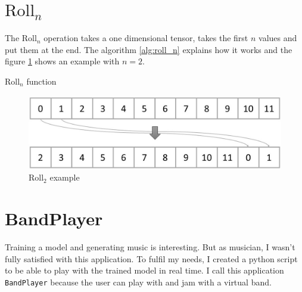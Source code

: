 \documentclass[12pt]{report}
\begin{document}
\section{$\text{Roll}_n$}
\label{appendix:roll_n}

The $\text{Roll}_n$ operation takes a one dimensional tensor, takes the first $n$ values and put them at the end.
The algorithm \ref{alg:roll_n} explains how it works and the figure \ref{fig:roll_2} shows an example with $n=2$.

\begin{algorithm}
    \begin{algorithmic}[1]
        \Statex
            \EndFor
            \State {}
        \EndFunction
        \end{algorithmic}
    \caption{$\text{Roll}_n$ function}
    \label{alg:roll_n}
\end{algorithm}

\begin{figure}[ht]
    \centering
    \includegraphics[width=\textwidth]{images/nn/tensor/roll_2.jpg}
    \caption{$\text{Roll}_2$ example}
    \label{fig:roll_2}
\end{figure}

\section{BandPlayer}

Training a model and generating music is interesting.
But as musician, I wasn't fully satisfied with this application.
To fulfil my needs, I created a python script to be able to play with the trained model in real time.
I call this application \texttt{BandPlayer} because the user can play with and jam with a virtual band.
\end{document}
